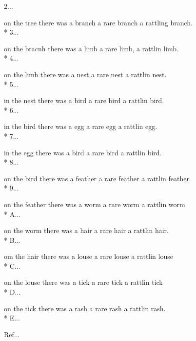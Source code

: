 \begin{SongText}
\begin{SongVerse}
2...
\end{SongVerse}
\begin{SongVerse}
on the tree there was a branch a rare branch a rattling branch.\\*%
3...
\end{SongVerse}
\begin{SongVerse}
on the bracnh there was a limb a rare limb, a rattlin limb.\\*%
4...
\end{SongVerse}
\begin{SongVerse}
on the limb there was a nest a rare nest a rattlin nest.\\*%
5...
\end{SongVerse}
\begin{SongVerse}
in the nest there was a bird a rare bird a rattlin bird.\\*%
6...
\end{SongVerse}
\begin{SongVerse}
in the bird there was a egg a rare egg a rattlin egg.\\*%
7...
\end{SongVerse}
\begin{SongVerse}
in the egg there was a bird a rare bird a rattlin bird.\\*%
8...
\end{SongVerse}
\begin{SongVerse}
on the bird there was a feather a rare feather a rattlin feather.\\*%
9...
\end{SongVerse}
\begin{SongVerse}
on the feather there was a worm a rare worm a rattlin worm\\*%
A...
\end{SongVerse}
\begin{SongVerse}
on the worm there was a hair a rare hair a rattlin hair. \\*%
B...
\end{SongVerse}
\begin{SongVerse}
om the hair there was a louse a rare louse a rattlin louse\\*%
C...
\end{SongVerse}
\begin{SongVerse}
on the louse there was a tick a rare tick a rattlin tick\\*%
D...
\end{SongVerse}
\begin{SongVerse}
on the tick there was a rash a rare rash a rattlin rash.\\*%
E...
\end{SongVerse}
\begin{SongVerse}
Ref...
\end{SongVerse}
\end{SongText}
